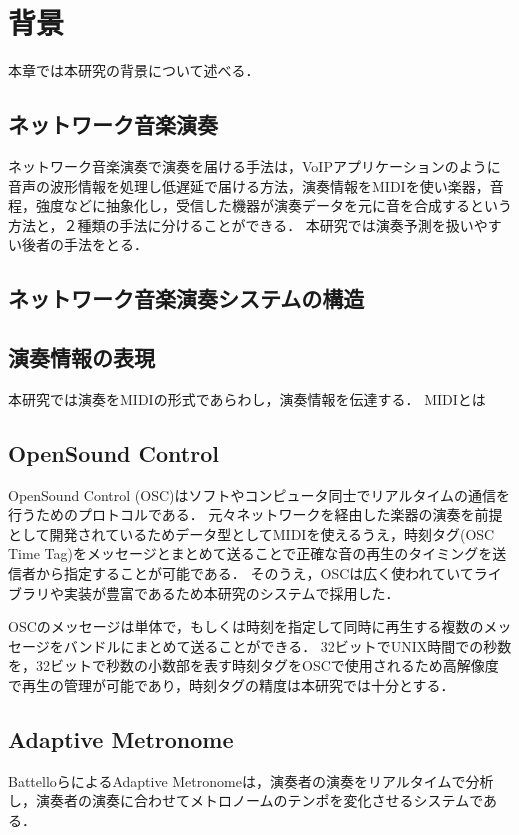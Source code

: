 \chapter{背景}
\label{background}

本章では本研究の背景について述べる．

\section{ネットワーク音楽演奏}
ネットワーク音楽演奏で演奏を届ける手法は，VoIPアプリケーションのように音声の波形情報を処理し低遅延で届ける方法\cite{syncroom}\cite{lola}\cite{jacktrip}，演奏情報をMIDIを使い楽器，音程，強度などに抽象化し，受信した機器が演奏データを元に音を合成するという方法\cite{rtpmidi}\cite{sourcenode}と，２種類の手法に分けることができる．
本研究では演奏予測を扱いやすい後者の手法をとる．

\section{ネットワーク音楽演奏システムの構造}

\section{演奏情報の表現}
本研究では演奏をMIDIの形式であらわし，演奏情報を伝達する．
MIDIとは

\section{OpenSound Control}
OpenSound Control (OSC)\cite{opensoundcontrol}はソフトやコンピュータ同士でリアルタイムの通信を行うためのプロトコルである．
元々ネットワークを経由した楽器の演奏を前提として開発されているためデータ型としてMIDIを使えるうえ，時刻タグ(OSC Time Tag)をメッセージとまとめて送ることで正確な音の再生のタイミングを送信者から指定することが可能である．
そのうえ，OSCは広く使われていてライブラリや実装が豊富であるため本研究のシステムで採用した．


OSCのメッセージは単体で，もしくは時刻を指定して同時に再生する複数のメッセージをバンドルにまとめて送ることができる．
32ビットでUNIX時間での秒数を，32ビットで秒数の小数部を表す時刻タグをOSCで使用されるため高解像度で再生の管理が可能であり，時刻タグの精度は本研究では十分とする．


\section{Adaptive Metronome}
BattelloらによるAdaptive Metronome\cite{admet}\cite{admet:experiment}は，演奏者の演奏をリアルタイムで分析し，演奏者の演奏に合わせてメトロノームのテンポを変化させるシステムである．

